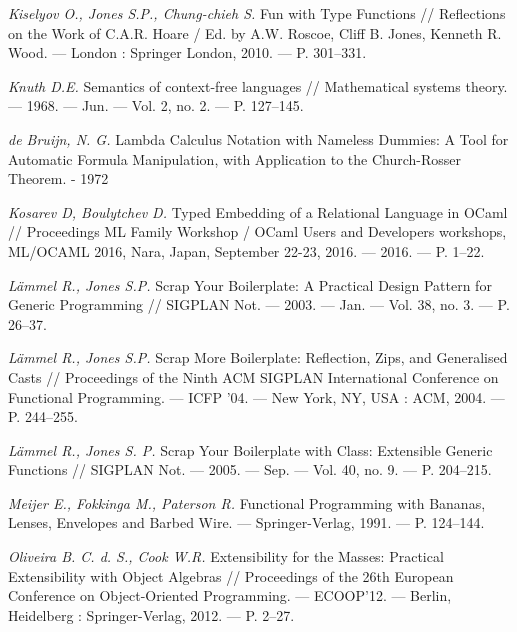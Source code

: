 \begin{thebibliography}{99}
{\em Kiselyov O., Jones S.P.,  Chung-chieh S. } Fun with
Type Functions // Reflections on the Work of C.A.R. Hoare / Ed. by
A.W. Roscoe, Cliff B. Jones, Kenneth R. Wood. — London : Springer
London, 2010. — P. 301–331. %

{\em Knuth D.E.} Semantics of context-free languages // Mathemati\-cal systems theory. — 1968. — Jun. — Vol. 2, no. 2. — P. 127–145. 

{\em de Bruijn, N. G.} Lambda Calculus Notation with Nameless Dummies: A Tool for Automatic Formula Manipulation, with Application to the Church-Rosser Theorem. - 1972


{\em Kosarev D, Boulytchev D.} Typed Embedding of a Relational Language in OCaml // Proceedings ML Family Workshop /
OCaml Users and Developers workshops, ML/OCAML 2016, Nara,
Japan, September 22-23, 2016. — 2016. — P. 1–22. 

{\em L\"ammel R., Jones S.P.} Scrap Your Boilerplate: A Practical Design Pattern for Generic Programming // SIGPLAN Not. —
2003. — Jan. — Vol. 38, no. 3. — P. 26–37. 

{\em L\"ammel R., Jones S.P.} Scrap More Boilerplate: Reflection, Zips, and Generalised Casts // Proceedings of the Ninth ACM
SIGPLAN International Conference on Functional Programming. —
ICFP ’04. — New York, NY, USA : ACM, 2004. — P. 244–255. 

{\em L\"ammel R., Jones S. P.} Scrap Your Boilerplate with Class:
Extensible Generic Functions // SIGPLAN Not. — 2005. — Sep. —
Vol. 40, no. 9. — P. 204–215. %

{\em Meijer E., Fokkinga M., Paterson R.} Functional Programming with Bananas, Lenses, Envelopes and Barbed Wire. — Springer-Verlag, 1991. — P. 124–144.

{\em Oliveira B. C. d. S., Cook W.R.} Extensibility for the
Masses: Practical Extensibility with Object Algebras // Proceedings of the 26th European Conference on Object-Oriented Programming. — ECOOP’12. — Berlin, Heidelberg : Springer-Verlag,
2012. — P. 2–27.


\end{thebibliography}
